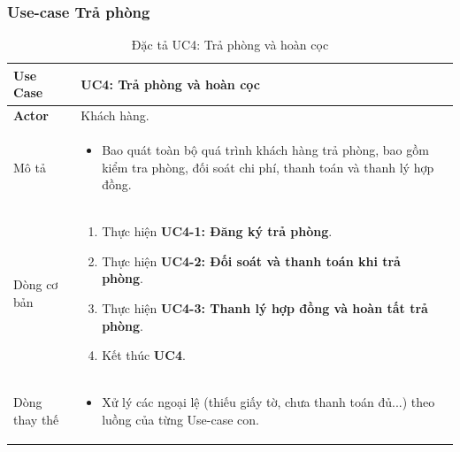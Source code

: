 \subsubsection{Use-case Trả phòng}

\begin{table}[!ht]
    \centering
\begin{tabularx}{\textwidth}{|>{\centering\arraybackslash\bfseries}m{3.5cm}|X|}
    \hline
    Use Case & {\centering\textbf{UC4: Trả phòng và hoàn cọc}\par} \\ 
    \hline
     
    Actor & Khách hàng. \\
    \hline

    Mô tả & 
    \begin{itemize}[leftmargin=*, nosep, label=-]
        \vspace{0.1cm}
        \item Bao quát toàn bộ quá trình khách hàng trả phòng, bao gồm kiểm tra phòng, đối soát chi phí, thanh toán và thanh lý hợp đồng.
    \end{itemize} \\ 
    \hline
     
    Dòng cơ bản & 
    \begin{enumerate}[leftmargin=*, nosep]
        \vspace{0.1cm}
        \item Thực hiện \textbf{UC4-1: Đăng ký trả phòng}.
        \item Thực hiện \textbf{UC4-2: Đối soát và thanh toán khi trả phòng}.
        \item Thực hiện \textbf{UC4-3: Thanh lý hợp đồng và hoàn tất trả phòng}.
        \item Kết thúc \textbf{UC4}.
    \end{enumerate} \\ 
    \hline
     
    Dòng thay thế & 
    \begin{itemize}[leftmargin=*, nosep, label=-]
        \vspace{0.1cm}
        \item Xử lý các ngoại lệ (thiếu giấy tờ, chưa thanh toán đủ...) theo luồng của từng Use-case con.
    \end{itemize} \\ 
    \hline
\end{tabularx}
\caption{Đặc tả UC4: Trả phòng và hoàn cọc}
\end{table}

